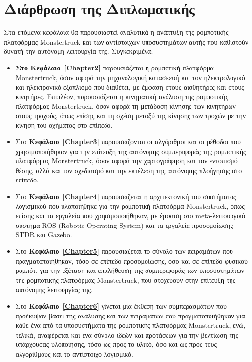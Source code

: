 
\section{Διάρθρωση της Διπλωματικής}
Στα επόμενα κεφάλαια θα παρουσιαστεί αναλυτικά η ανάπτυξη της ρομποτικής πλατφόρμας Monstertruck και των αντίστοιχων υποσυστημάτων αυτής που καθιστούν δυνατή την αυτόνομη λειτουργία της. Συγκεκριμένα:

\begin{itemize}
	\item \textbf{Στο Κεφάλαιο~\ref{Chapter2}} παρουσιάζεται η ρομποτική πλατφόρμα Monstertruck, όσον αφορά την μηχανολογική κατασκευή και τον ηλεκτρολογικό και ηλεκτρονικό εξοπλισμό που διαθέτει, με έμφαση στους αισθητήρες και στους κινητήρες. Επιπλέον, παρουσιάζεται η κινηματική ανάλυση της ρομποτικής πλατφόρμας Monstertruck, όσον αφορά τη μετάδοση κίνησης των κινητήρων στους τροχούς, όπως επίσης και τη σχέση μεταξύ της κίνησης των τροχών με την κίνηση του οχήματος στο επίπεδο.
	\item Στο \textbf{Κεφάλαιο~\ref{Chapter3}} παρουσιάζονται οι αλγόριθμοι και οι μέθοδοι που χρησιμοποιήθηκαν για την επίτευξη της αυτόνομης συμπεριφοράς της ρομποτικής πλατφόρμας Monstertruck, όσον αφορά την χαρτογράφηση και τον εντοπισμό θέσης, αλλά και τον σχεδιασμό και την εκτέλεση της αυτόνομης πλοήγησης στο επίπεδο.
	\item Στο \textbf{Κεφάλαιο~\ref{Chapter4}} παρουσιάζεται η αρχιτεκτονική του συστήματος λογισμικού που υλοποιήθηκε για την ρομποτική πλατφόρμα Monstertruck, όπως επίσης και τα εργαλεία που χρησιμοποιήθηκαν, με έμφαση στο meta-λειτουργικό σύστημα ROS (Robotic Operating System) και τα εργαλεία προσομοίωσης STDR και Gazebo.
	\item Στο \textbf{Κεφάλαιο~\ref{Chapter5}} παρουσιάζεται το σύνολο των πειραμάτων που πραγματοποιήθηκαν, τόσο σε επίπεδο προσομοίωσης, όσο και σε επίπεδο φυσικού ρομπότ, για την εξέταση και επαλήθευση της συμπεριφοράς των υποσυστημάτων της ρομποτικής πλατφόρμας Monstertruck, που στοχεύουν στην επίτευξη της αυτόνομης λειτουργίας της.
	\item Στο \textbf{Κεφάλαιο~\ref{Chapter6}} γίνεται μία έκθεση των συμπερασμάτων που προέκυψαν βάσει της ανάλυσης και των πειραμάτων που πραγματοποιήθηκαν για κάθε ένα από τα υποσυστήματα της ρομποτικής πλατφόρμας Monstertruck, ενώ, τελικά, αναφέρεται και ένα σύνολο ιδεών και προτάσεων για την βελτίωση της υπάρχουσας υλοποίησης, τόσο ως προς το υλικό, όσο και ως προς τους αλγορίθμους και το αντίστοιχο λογισμικό.
\end{itemize}
